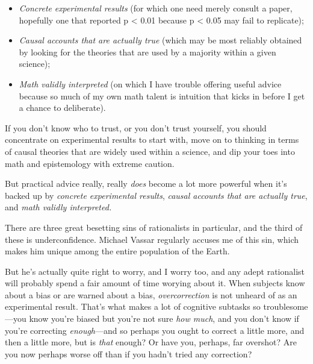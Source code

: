 \begin{itemize}
\item {
 \textit{Concrete} \textit{experimental results} (for which one
need merely consult a paper, hopefully one that reported p {\textless}
0.01 because p {\textless} 0.05 may fail to replicate);}

\item {
 \textit{Causal accounts that are actually true} (which may be most
reliably obtained by looking for the theories that are used by a
majority within a given science);}

\item {
 \textit{Math validly interpreted} (on which I have trouble
offering useful advice because so much of my own math talent is
intuition that kicks in before I get a chance to deliberate).}
\end{itemize}

{
 If you don't know who to trust, or you
don't trust yourself, you should concentrate on
experimental results to start with, move on to thinking in terms of
causal theories that are widely used within a science, and dip your
toes into math and epistemology with extreme caution.}

{
 But practical advice really, really \textit{does} become a lot
more powerful when it's backed up by \textit{concrete
experimental results}, \textit{causal accounts that are actually true},
and \textit{math validly interpreted.}}

\myendsectiontext


{
 There are three great besetting sins of rationalists in
particular, and the third of these is underconfidence. Michael Vassar
regularly accuses me of this sin, which makes him unique among the
entire population of the Earth. }

{
 But he's actually quite right to worry, and I
worry too, and any adept rationalist will probably spend a fair amount
of time worying about it. When subjects know about a bias or are warned
about a bias, \textit{overcorrection} is not unheard of as an
experimental result. That's what makes a lot of
cognitive subtasks so troublesome---you know you're
biased but you're not sure \textit{how much}, and you
don't know if you're correcting
\textit{enough}{}---and so perhaps you ought to correct a little more,
and then a little more, but is \textit{that} enough? Or have you,
perhaps, far overshot? Are you now perhaps worse off than if you
hadn't tried any correction?}

